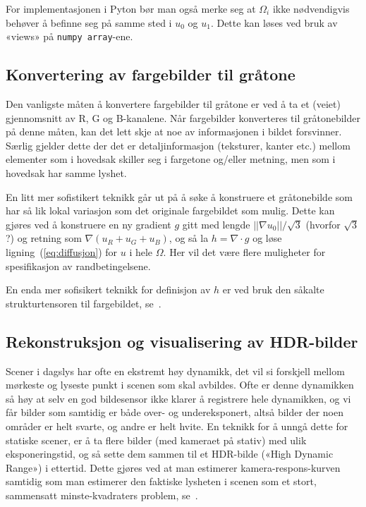 \documentclass[11pt,a4paper]{article}
\begin{document}
For implementasjonen i Pyton bør man også merke seg at $\Omega_i$ ikke
nødvendigvis behøver å befinne seg på samme sted i $u_0$ og $u_1$.
Dette kan løses ved bruk av «views» på \texttt{numpy array}-ene.

\subsection{Konvertering av fargebilder til gråtone}

Den vanligste måten å konvertere fargebilder til gråtone er ved å ta
et (veiet) gjennomsnitt av R, G og B-kanalene. Når fargebilder
konverteres til gråtonebilder på denne måten, kan det lett skje at noe
av informasjonen i bildet forsvinner. Særlig gjelder dette der det er
detaljinformasjon (teksturer, kanter etc.) mellom elementer som i
hovedsak skiller seg i fargetone og/eller metning, men som i hovedsak
har samme lyshet.

En litt mer sofistikert teknikk går ut på å søke å konstruere et
gråtonebilde som har så lik lokal variasjon som det originale
fargebildet som mulig. Dette kan gjøres ved å konstruere en ny
gradient $g$ gitt med lengde $||\nabla u_0||/\sqrt{3}$ (hvorfor
$\sqrt{3}$?) og retning som $\nabla(u_R + u_G + u_B)$, og så la
$h = \nabla\cdot g$ og løse ligning~(\ref{eq:diffusjon}) for $u$ i
hele $\Omega$. Her vil det være flere muligheter for spesifikasjon av
randbetingelsene.

En enda mer sofisikert teknikk for definisjon av $h$ er ved bruk den
såkalte strukturtensoren til fargebildet, se~\cite{Alsam:08}.

\subsection{Rekonstruksjon og visualisering av HDR-bilder}

Scener i dagslys har ofte en ekstremt høy dynamikk, det vil si
forskjell mellom mørkeste og lyseste punkt i scenen som skal avbildes.
Ofte er denne dynamikken så høy at selv en god bildesensor ikke klarer
å registrere hele dynamikken, og vi får bilder som samtidig er både
over- og undereksponert, altså bilder der noen områder er helt svarte,
og andre er helt hvite. En teknikk for å unngå dette for statiske
scener, er å ta flere bilder (med kameraet på stativ) med ulik
eksponeringstid, og så sette dem sammen til et HDR-bilde («High
Dynamic Range») i ettertid. Dette gjøres ved at man estimerer
kamera-respons-kurven samtidig som man estimerer den faktiske lysheten
i scenen som et stort, sammensatt minste-kvadraters problem,
se~\cite{Debevec:97}.
\end{document}
